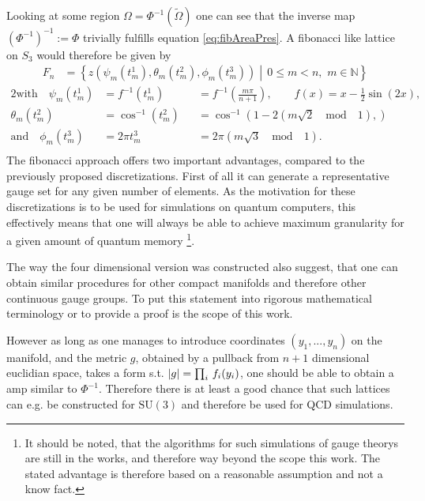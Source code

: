 Looking at some region $\Omega = \Phi^{-1} (\tilde{\Omega})$ one can see that the inverse map $(\Phi^{-1})^{-1} := \Phi$ trivially fulfills equation \ref{eq:fibAreaPres}. A fibonacci like lattice on $S_3$ would therefore be given by
\begin{align*}
 F_n & = \left\{ z\left(\psi_m(t_m^1), \theta_m(t_m^2), \phi_m(t_m^3)\right)  \middle| \, 0 \le m < n, \, \, m \in \mathbb{N} \right\}
\end{align*}
\begin{alignat*}{2}
 \textrm{with} \quad \psi_m(t_m^1) & =  f^{-1} \left( t_m^1 \right)  &  & = f^{-1} \left( \frac{m\pi}{n+1}\right), \qquad f(x) = x - \frac{1}{2} \sin(2x) ,                                                                     \\
 \theta_m(t_m^2)                   & =  \cos^{-1}\left(t_m^2 \right) &  & =  \cos^{-1}\left(1-2(m\sqrt{2} \quad \mathrm{mod} \quad 1), \right)                                                                                  \\
 \textrm{and} \quad \phi_m (t_m^3) & =  2 \pi t^3_m                  &  & =                        2 \pi (m\sqrt{3} \quad \mathrm{mod} \quad 1)                                                                      \textrm{.} \\
\end{alignat*}
The fibonacci approach offers two important advantages, compared to the previously proposed discretizations. First of all it can generate a representative gauge set for any given number of elements. As the motivation for these discretizations is to be used for simulations on quantum computers, this effectively means that one will always be able to achieve maximum granularity for a given amount of quantum memory \footnote{It should be noted, that the algorithms for such simulations of \SUTwo gauge theorys are still in the works, and therefore way beyond the scope this work. The stated advantage is therefore based on a reasonable assumption and not a know fact.}.

The way the four dimensional version was constructed also suggest, that one can obtain similar procedures for other compact manifolds and therefore other continuous gauge groups. To put this statement into rigorous mathematical terminology or to provide a proof is the scope of this work.

However as long as one manages to introduce coordinates $(y_1, ..., y_n)$ on the manifold, and the metric $g$, obtained by a pullback from $n+1$ dimensional euclidian space, takes a form s.t. $\abs{g} = \prod_{i} \, f_i(y_i)$, one should be able to obtain a amp similar to $\Phi^{-1}$. Therefore there is at least a good chance that such lattices can e.g. be constructed for $\textrm{SU}(3)$ and therefore be used for QCD simulations.

